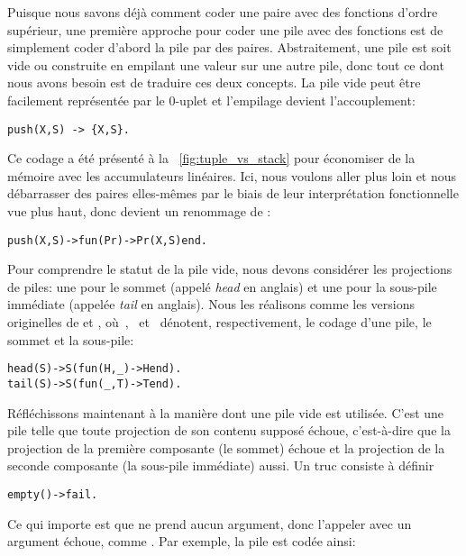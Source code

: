 Puisque nous savons déjà comment coder une paire avec des fonctions
d'ordre supérieur, une première approche pour coder une pile avec des
fonctions est de simplement coder d'abord la pile par des
paires. Abstraitement, une pile est soit vide ou construite en
empilant une valeur sur une autre pile, donc tout ce dont nous avons
besoin est de traduire ces deux concepts. La pile vide peut être
facilement représentée par le \(0\)-uplet \erlcode{\{\}} et l'empilage
devient l'accouplement:
\begin{verbatim}
push(X,S) -> {X,S}.
\end{verbatim}
Ce codage a été présenté à la \fig~\vref{fig:tuple_vs_stack} pour
économiser de la mémoire avec les accumulateurs linéaires. Ici, nous
voulons aller plus loin et nous débarrasser des paires elles-mêmes par
le biais de leur interprétation fonctionnelle vue plus haut, donc
 devient un renommage de :
\begin{alltt}
push(X,S) -> fun(Pr) -> Pr(X,S) end.\hfill% \emph{Voir} mk_pair/2
\end{alltt}
Pour comprendre le statut de la pile vide, nous devons considérer les
projections de piles: une pour le sommet (appelé \emph{head} en
anglais) et une pour la sous-pile immédiate (appelée \emph{tail} en
anglais). Nous les réalisons comme les versions originelles de
 et , où~,
~et~ dénotent, respectivement, le codage d'une
pile, le sommet et la sous-pile:
\begin{alltt}
head(S) -> S(fun(H,\_) -> H end).\hfill% \emph{Voir} fst/2
tail(S) -> S(fun(\_,T) -> T end).\hfill% \emph{Voir} snd/2
\end{alltt}
Réfléchissons maintenant à la manière dont une pile vide est
utilisée. C'est une pile telle que toute projection de son contenu
supposé échoue, c'est-à-dire que la projection de la première
composante (le sommet) échoue et la projection de la seconde
composante (la sous-pile immédiate) aussi. Un truc consiste à définir
\begin{alltt}
empty() -> fail.\hfill% \emph{L'atome} fail \emph{est arbitraire}
\end{alltt}
Ce qui importe est que  ne prend aucun argument, donc
l'appeler avec un argument échoue, comme . Par exemple, la pile \erlcode{[a,b,c]} est codée ainsi:
\begin{center}
\end{center}
